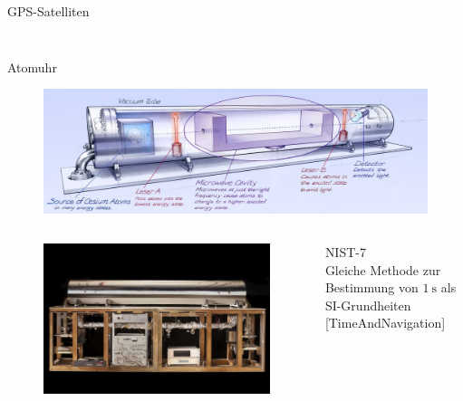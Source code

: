 \begin{frame}{GPS-Satelliten}
\begin{columns}
\begin{column}{0.5\textwidth}
\begin{figure}
            \end{figure}
        \end{column}
    \end{columns}
\end{frame}

\begin{frame}{Atomuhr}
    \begin{figure}
        \centering
        \includegraphics[width=\textwidth]{images/nist-7.jpg}
    \end{figure}
    \begin{columns}
        \begin{column}{0.5\textwidth}
            \begin{figure}
                \centering
                \includegraphics[height=0.4\textheight]{images/nist-7-real.jpg}
            \end{figure}
        \end{column}
        \begin{column}{0.5\textwidth}
            NIST-7\\
            Gleiche Methode zur Bestimmung von $\SI{1}{\second}$ als SI-Grundheiten
            {\small [TimeAndNavigation]}
        \end{column}
    \end{columns}
\end{frame}
